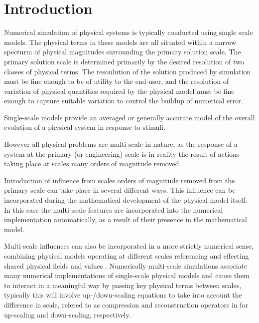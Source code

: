 \documentclass[11pt]{article}
\begin{document}
\maketitle

\begin{abstract}
\end{abstract}

\section{Introduction}\label{introduction}

\label{single_scale_simulations}
Numerical simulation of physical systems is typically conducted using single scale models. The physical terms in these models are all situated within a narrow specturm of physical magnitudes surrounding the primary solution scale. The primary solution scale is determined primarily by the desired resolution of two classes of physical terms. The resoulution of the solution produced by simulation must be fine enough to be of utility to the end-user, and the resolution of variation of physical quantities required by the physical model must be fine enough to capture suitable variation to control the buildup of numerical error.




Single-scale models provide an averaged or generally accurate model of the overall evolution of a physical system in response to stimuli. 

However all physical problems are multi-scale in nature, as the response of a system at the primary (or engineering) scale is in reality the result of actions taking place at scales many orders of magnitude removed. 




\label{multi_scale_simulations}


Introduction of influence from scales orders of magnitude removed from the primary scale can take place in several different ways. This influence can be incorporated during the mathematical development of the physical model itself. In this case the multi-scale features are incorporated into the numerical implementation automatically, as a result of their presence in the mathematical model. 

Multi-scale influences can also be incorporated in a more strictly numerical sense, combining physical models operating at different scales referencing and effecting shared physical fields and values \cite{shenoy97} \cite{weinan2003heterogenous}. Numerically multi-scale simulations associate many numerical implementations of single-scale physical models and cause them to interact in a meaningful way by passing key physical terms between scales, typically this will involve up-/down-scaling equations to take into account the difference in scale, refered to as compression and reconstruction operators in \cite{weinan2003heterogenous} for up-scaling and down-scaling, respectively. 
\end{document}
